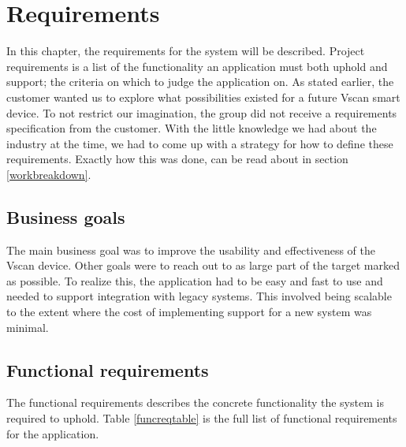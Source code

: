\section{Requirements}
\label{requirements}
In this chapter, the requirements for the system will be described. Project requirements is a list of the functionality an application must both uphold and support; the criteria on which to judge the application on. As stated earlier, the customer wanted us to explore what possibilities existed for a future Vscan smart device. To not restrict our imagination, the group did not receive a requirements specification from the customer. With the little knowledge we had about the industry at the time, we had to come up with a strategy for how to define these requirements. Exactly how this was done, can be read about in section \ref{workbreakdown}.

\subsection{Business goals}
The main business goal was to improve the usability and effectiveness of the Vscan device. Other goals were to reach out to as large part of the target marked as possible. To realize this, the application had to be easy and fast to use and needed to support integration with legacy systems. This involved being scalable to the extent where the cost of implementing support for a new system was minimal.

\newpage

\subsection{Functional requirements}
The functional requirements describes the concrete functionality the system is required to uphold. Table \ref{funcreqtable} is the full list of functional requirements for the application.



